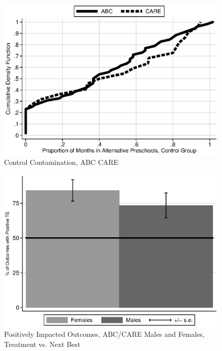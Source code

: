 \begin{frame}[plain]
	\begin{center}
\begin{figure}[H] 
\caption{Control Contamination, ABC CARE}
\label{figure:youlabel}
\centering
\includegraphics[width=.9\columnwidth]{output/abccare_controlcontamination.eps}
\end{figure}
\end{center}
\end{frame}

\begin{frame}[plain]
	\begin{center}
\begin{figure}[H] 
\caption{Positively Impacted Outcomes, ABC/CARE Males and Females, Treatment vs. Next Best}
\label{figure:youlabel}
\centering
\includegraphics[width=.9\columnwidth]{output/itt_noctrl_all.eps}
\end{figure}
\end{center}
\end{frame}


